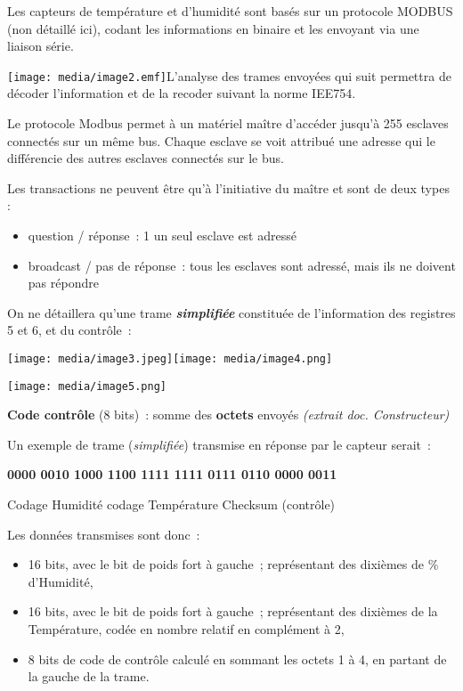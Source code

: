Les capteurs de température et d'humidité sont basés sur un protocole
MODBUS (non détaillé ici), codant les informations en binaire et les
envoyant via une liaison série.

\texttt{[image: media/image2.emf]}L'analyse
des trames envoyées qui suit permettra de décoder l'information et de la
recoder suivant la norme IEE754.

Le protocole Modbus permet à un matériel maître d'accéder jusqu'à 255
esclaves connectés sur un même bus. Chaque esclave se voit attribué une
adresse qui le différencie des autres esclaves connectés sur le bus.

Les transactions ne peuvent être qu'à l'initiative du maître et sont de
deux types :

\begin{itemize}
\item
  question / réponse~: 1 un seul esclave est adressé
\item
  broadcast / pas de réponse~: tous les esclaves sont adressé, mais ils
  ne doivent pas répondre
\end{itemize}

On ne détaillera qu'une trame \emph{\textbf{simplifiée}} constituée de
l'information des registres 5 et 6, et du contrôle~:

\texttt{[image: media/image3.jpeg]}\texttt{[image: media/image4.png]}

\texttt{[image: media/image5.png]}

\textbf{Code contrôle} (8 bits)~: somme des \textbf{octets} envoyés
\emph{(extrait doc. Constructeur)}

Un exemple de trame (\emph{simplifiée}) transmise en réponse par le
capteur serait~:

\textbf{0000 0010 1000 1100 1111 1111 0111 0110 0000 0011}

Codage Humidité codage Température Checksum (contrôle)

Les données transmises sont donc~:

\begin{itemize}
\item
  16 bits, avec le bit de poids fort à gauche~; représentant des
  dixièmes de \% d'Humidité,
\item
  16 bits, avec le bit de poids fort à gauche~; représentant des
  dixièmes de la Température, codée en nombre relatif en complément à 2,
\item
  8 bits de code de contrôle calculé en sommant les octets 1 à 4, en
  partant de la gauche de la trame.
\end{itemize}

